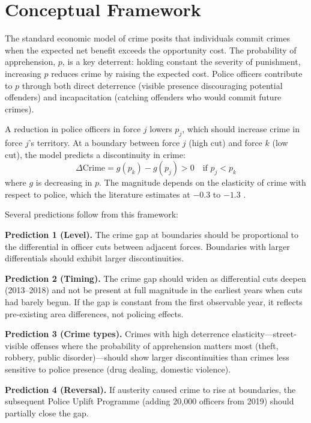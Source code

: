 \documentclass[12pt]{article}
\begin{document}
\section{Conceptual Framework}

The standard economic model of crime \citep{becker1968} posits that individuals commit crimes when the expected net benefit exceeds the opportunity cost. The probability of apprehension, $p$, is a key deterrent: holding constant the severity of punishment, increasing $p$ reduces crime by raising the expected cost. Police officers contribute to $p$ through both direct deterrence (visible presence discouraging potential offenders) and incapacitation (catching offenders who would commit future crimes).

A reduction in police officers in force $j$ lowers $p_j$, which should increase crime in force $j$'s territory. At a boundary between force $j$ (high cut) and force $k$ (low cut), the model predicts a discontinuity in crime:
\begin{equation}
\Delta \text{Crime} = g(p_k) - g(p_j) > 0 \quad \text{if } p_j < p_k
\end{equation}
where $g$ is decreasing in $p$. The magnitude depends on the elasticity of crime with respect to police, which the literature estimates at $-0.3$ to $-1.3$ \citep{draca2011, mello2019}.

Several predictions follow from this framework:

\textbf{Prediction 1 (Level).} The crime gap at boundaries should be proportional to the differential in officer cuts between adjacent forces. Boundaries with larger differentials should exhibit larger discontinuities.

\textbf{Prediction 2 (Timing).} The crime gap should widen as differential cuts deepen (2013--2018) and not be present at full magnitude in the earliest years when cuts had barely begun. If the gap is constant from the first observable year, it reflects pre-existing area differences, not policing effects.

\textbf{Prediction 3 (Crime types).} Crimes with high deterrence elasticity---street-visible offenses where the probability of apprehension matters most (theft, robbery, public disorder)---should show larger discontinuities than crimes less sensitive to police presence (drug dealing, domestic violence).

\textbf{Prediction 4 (Reversal).} If austerity caused crime to rise at boundaries, the subsequent Police Uplift Programme (adding 20,000 officers from 2019) should partially close the gap.
\end{document}
